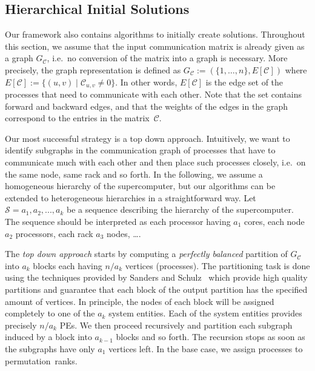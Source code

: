 \documentclass[11pt]{article}
\newcommand{\ie}{i.e.\ }
\begin{document}
\subsection{Hierarchical Initial Solutions}
Our framework also contains algorithms to initially create solutions.
Throughout this section, we assume that the input communication matrix is already given as a graph $G_\mathcal{C}$, \ie no conversion of the matrix into a graph is necessary.
 More precisely, the graph representation is defined as $G_\mathcal{C}:=(\{1,\ldots, n\}, E[\mathcal{C}])$ where $E[\mathcal{C}] :=\{(u,v) \mid \mathcal{C}_{u,v} \not = 0\}$.
 In other words, $E[\mathcal{C}]$ is the edge set of the processes that need to communicate with each other. 
Note that the set contains forward and backward edges, and that the weights of the edges in the graph correspond to the entries in the matrix~$\mathcal{C}$. 

\label{s:mainsection}
\label{s:main}
Our most successful strategy is a top down approach. Intuitively, we want to identify subgraphs in the
communication graph of processes that have to communicate much with
each other and then place such processes closely, \ie on the same
node, same rack and so forth.  In the following, we assume a
homogeneous hierarchy of the supercomputer, but our algorithms can be extended to heterogeneous hierarchies in a straightforward way. Let $\mathcal{S}=a_1, a_2,
..., a_k$ be a sequence describing the hierarchy of the
supercomputer. The sequence should be interpreted as each processor having
$a_1$ cores, each node $a_2$ processors, each rack $a_3$ nodes, \ldots.

The \emph{top down approach} starts by computing a \emph{perfectly balanced} partition of $G_\mathcal{C}$ into $a_k$ blocks each having $n/a_k$ vertices (processes). The partitioning task is done using the techniques provided by Sanders and Schulz~\cite{kabapeE} which provide high quality partitions and guarantee that each block of the output partition has the specified amount of vertices. In principle, the nodes of each block will be assigned completely to one of the $a_k$ system entities. 
Each of the system entities provides precisely $n/a_k$ PEs. 
We then proceed recursively and partition each subgraph induced by a block into $a_{k-1}$ blocks and so forth. 
The recursion stops as soon as the subgraphs have only $a_1$ vertices left. 
In the base case, we assign processes to permutation~ranks. 
\end{document}
